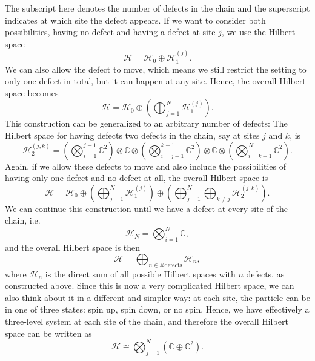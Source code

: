 \documentclass[aps,prb,twocolumn,superscriptaddress,noshowkeys]{revtex4-2}  %
\theoremstyle{plain}%
\theoremstyle{definition}
\theoremstyle{remark}
\begin{document}
The subscript here denotes the number of defects in the chain and the superscript indicates at which site the defect appears. If we want to consider both possibilities, having no defect and having a defect at site $j$, we use the Hilbert space
\begin{equation}
\mathcal{H}=\mathcal{H}_0\oplus\mathcal{H}_1^{(j)}.
\end{equation}
We can also allow the defect to move, which means we still restrict the setting to only one defect in total, but it can happen at any site. Hence, the overall Hilbert space becomes
\begin{equation}
\mathcal{H}=\mathcal{H}_0\oplus\left(\bigoplus_{j=1}^N\mathcal{H}_1^{(j)}\right).
\end{equation}
This construction can be generalized to an arbitrary number of defects: The Hilbert space for having defects two defects in the chain, say at sites $j$ and $k$, is 
\begin{equation}
\mathcal{H}_2^{(j,k)}=\left(\bigotimes_{i=1}^{j-1}\mathbb{C}^2\right)\otimes\mathbb{C}\otimes\left(\bigotimes_{i=j+1}^{k-1}\mathbb{C}^2\right)\otimes\mathbb{C}\otimes\left(\bigotimes_{i=k+1}^{N}\mathbb{C}^2\right).
\end{equation}
Again, if we allow these defects to move and also include the possibilities of having only one defect and no defect at all, the overall Hilbert space is
\begin{equation}
\mathcal{H}=\mathcal{H}_0\oplus\left(\bigoplus_{j=1}^N\mathcal{H}_1^{(j)}\right)\oplus\left(\bigoplus_{j=1}^N\bigoplus_{k\neq j}\mathcal{H}_2^{(j,k)}\right).
\end{equation}
We can continue this construction until we have a defect at every site of the chain, i.e.
\begin{equation}
\mathcal{H}_N=\bigotimes_{i=1}^N\mathbb{C},
\end{equation}
and the overall Hilbert space is then
\begin{equation}
\mathcal{H}=\bigoplus_{n\in\#\mathrm{defects}}\mathcal{H}_n,
\end{equation}
where $\mathcal{H}_n$ is the direct sum of all possible Hilbert spaces with $n$ defects, as constructed above. Since this is now a very complicated Hilbert space, we can also think about it in a different and simpler way: at each site, the particle can be in one of three states: spin up, spin down, or no spin. Hence, we have effectively a three-level system at each site of the chain, and therefore the overall Hilbert space can be written as
\begin{equation}
\mathcal{H}\cong\bigotimes_{j=1}^N\left(\mathbb{C}\oplus\mathbb{C}^2\right).
\end{equation}
\end{document}
